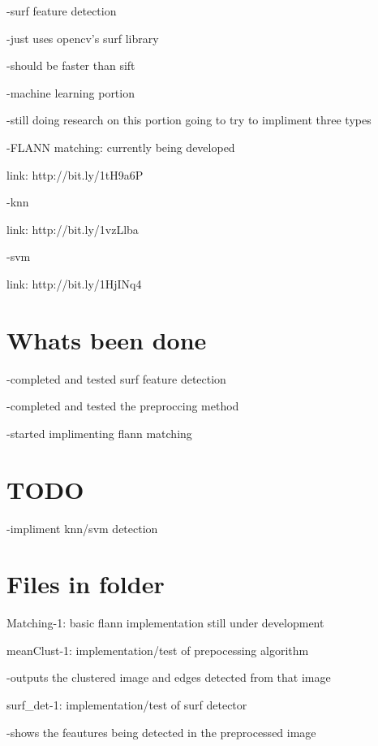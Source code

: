 -\/surf feature detection \begin{DoxyVerb}            -just uses opencv's surf library

              -should be faster than sift
\end{DoxyVerb}


-\/machine learning portion \begin{DoxyVerb}            -still doing research on this portion going to try to impliment three types

              -FLANN matching: currently being developed

                link: http://bit.ly/1tH9a6P

              -knn

                link: http://bit.ly/1vzLlba

              -svm

                link: http://bit.ly/1HjINq4
\end{DoxyVerb}


\section*{Whats been done }

-\/completed and tested surf feature detection

-\/completed and tested the preproccing method

-\/started implimenting flann matching

\section*{T\-O\-D\-O }

-\/impliment knn/svm detection

\section*{Files in folder }

Matching-\/1\-: basic flann implementation still under development

mean\-Clust-\/1\-: implementation/test of prepocessing algorithm \begin{DoxyVerb}            -outputs the clustered image and edges detected from that image
\end{DoxyVerb}


surf\-\_\-det-\/1\-: implementation/test of surf detector \begin{DoxyVerb}            -shows the feautures being detected in the preprocessed image\end{DoxyVerb}
 